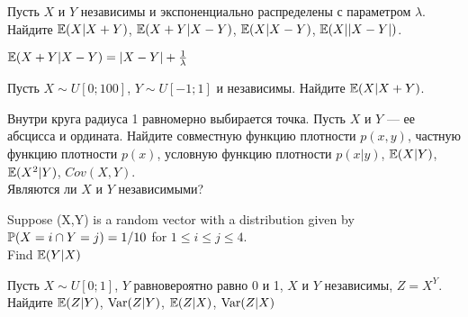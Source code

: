 \begin{problem}
Пусть $X$ и $Y$ независимы и экспоненциально распределены с параметром $\lambda$. \\
Найдите $\E(X|X+Y)$, $\E(X+Y|X-Y)$, $\E(X|X-Y)$, $\E(X||X-Y|)$.

\begin{sol}

 $\E(X+Y|X-Y)=|X-Y|+\frac{1}{\lambda}$
\end{sol}
\end{problem}

\begin{problem}
Пусть $X\sim U[0;100]$, $Y\sim U[-1;1]$ и независимы. Найдите $\E(X|X+Y)$.

\begin{sol}

\end{sol}
\end{problem}

\begin{problem}
Внутри круга радиуса 1 равномерно выбирается точка. Пусть $X$ и $Y$ — ее абсцисса и ордината. Найдите совместную функцию плотности $p(x,y)$, частную функцию плотности $p(x)$, условную функцию плотности $p(x|y)$, $\E(X|Y)$, $\E(X^{2}|Y)$, $Cov(X,Y)$. \\
Являются ли $X$ и $Y$ независимыми?

\begin{sol}

\end{sol}
\end{problem}

\begin{problem}
Suppose (X,Y) is a random vector with a distribution given by $\P(X=i \cap Y=j)=1/10$  for $1\le i\le j\le 4$. \\
Find $\E(Y|X)$

\begin{sol}

\end{sol}
\end{problem}

\begin{problem}
Пусть $X\sim U[0;1]$, $Y$ равновероятно равно 0 и 1, $X$ и $Y$ независимы, $Z=X^{Y}$.
Найдите $\E(Z|Y)$, $\Var(Z|Y)$, $\E(Z|X)$, $\Var(Z|X)$

\begin{sol}

\end{sol}
\end{problem}

